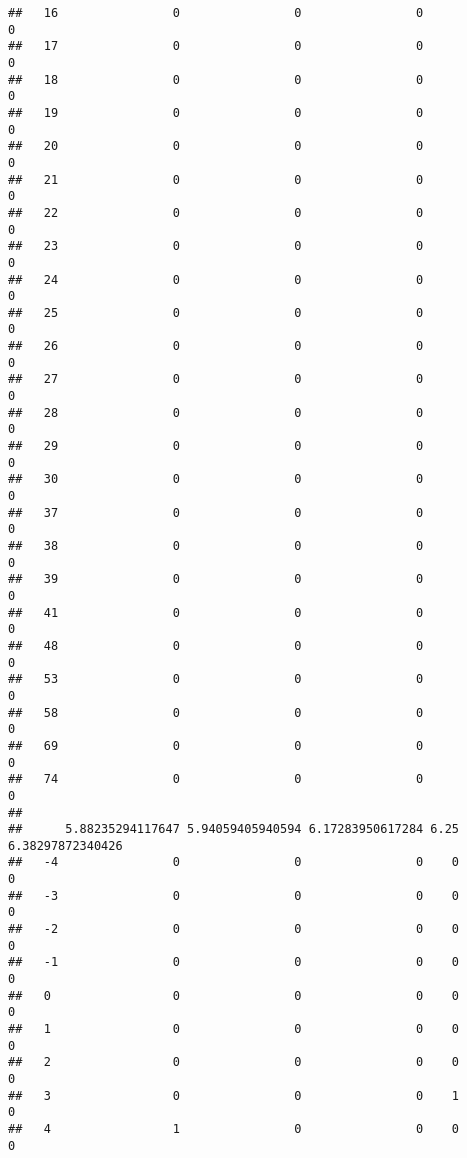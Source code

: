 \documentclass[]{article}
\begin{document}
\begin{verbatim}
##   16                0                0                0                0
##   17                0                0                0                0
##   18                0                0                0                0
##   19                0                0                0                0
##   20                0                0                0                0
##   21                0                0                0                0
##   22                0                0                0                0
##   23                0                0                0                0
##   24                0                0                0                0
##   25                0                0                0                0
##   26                0                0                0                0
##   27                0                0                0                0
##   28                0                0                0                0
##   29                0                0                0                0
##   30                0                0                0                0
##   37                0                0                0                0
##   38                0                0                0                0
##   39                0                0                0                0
##   41                0                0                0                0
##   48                0                0                0                0
##   53                0                0                0                0
##   58                0                0                0                0
##   69                0                0                0                0
##   74                0                0                0                0
##     
##      5.88235294117647 5.94059405940594 6.17283950617284 6.25 6.38297872340426
##   -4                0                0                0    0                0
##   -3                0                0                0    0                0
##   -2                0                0                0    0                0
##   -1                0                0                0    0                0
##   0                 0                0                0    0                0
##   1                 0                0                0    0                0
##   2                 0                0                0    0                0
##   3                 0                0                0    1                0
##   4                 1                0                0    0                0

\end{verbatim}
\end{document}
